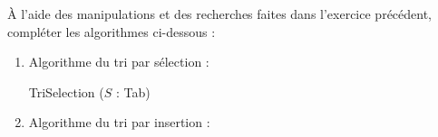 \documentclass[a4paper,french]{article}
\begin{document}
À l'aide des manipulations et des recherches faites dans l'exercice précédent, compléter les algorithmes ci-dessous :

\begin{enumerate}
\item Algorithme du tri par sélection : 

\begin{algorithm}[H]
\DontPrintSemicolon
TriSelection ($S$ : Tab)\;
\BlankLine
\DontPrintSemicolon
{}
\PrintSemicolon
\BlankLine
\Deb{
\BlankLine
\BlankLine
\BlankLine
\BlankLine
\BlankLine
\BlankLine
\BlankLine
\BlankLine
\BlankLine
\BlankLine
\BlankLine
\BlankLine
\BlankLine
\BlankLine
\BlankLine
\BlankLine
\BlankLine
\BlankLine
\BlankLine
\BlankLine
\BlankLine
\BlankLine
\BlankLine
\BlankLine
\BlankLine
\BlankLine
\BlankLine
\BlankLine
\BlankLine
\BlankLine
\BlankLine
\BlankLine
\BlankLine
\BlankLine
\BlankLine
\BlankLine
\BlankLine
\BlankLine
\BlankLine
\BlankLine
\BlankLine
\BlankLine
\BlankLine
\BlankLine
\BlankLine
\BlankLine
\BlankLine
\BlankLine
\BlankLine
\BlankLine
\BlankLine
\BlankLine
\BlankLine
\BlankLine
\BlankLine
\BlankLine
\BlankLine
\BlankLine
\BlankLine
\BlankLine
\BlankLine
\BlankLine
\BlankLine
\BlankLine
\BlankLine
\BlankLine
\BlankLine
\BlankLine
\BlankLine
\BlankLine
\BlankLine
\BlankLine
\BlankLine
\BlankLine
\BlankLine
\BlankLine
\BlankLine
\BlankLine
\BlankLine
\BlankLine
\BlankLine
\BlankLine
\BlankLine
\BlankLine
\BlankLine
\BlankLine
\BlankLine
\BlankLine
\BlankLine
}
\end{algorithm}

\item Algorithme du tri par insertion : 


\end{enumerate}
\end{document}
